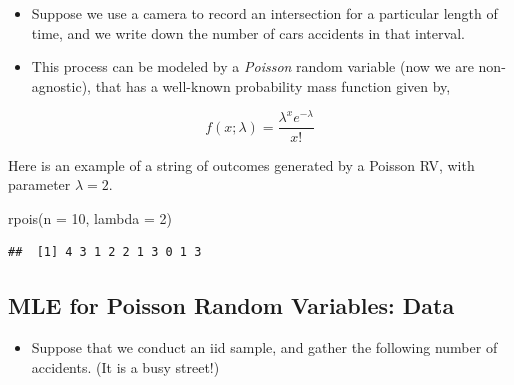 \documentclass[
]{book}
\newenvironment{Shaded}{\begin{snugshade}}{\end{snugshade}}
\newcommand{\AttributeTok}[1]{\textcolor[rgb]{0.77,0.63,0.00}{#1}}
\newcommand{\DecValTok}[1]{\textcolor[rgb]{0.00,0.00,0.81}{#1}}
\newcommand{\FunctionTok}[1]{\textcolor[rgb]{0.00,0.00,0.00}{#1}}
\newcommand{\NormalTok}[1]{#1}
\providecommand{\tightlist}{%
  \setlength{\itemsep}{0pt}\setlength{\parskip}{0pt}}
\theoremstyle{definition}
\theoremstyle{definition}
\theoremstyle{definition}
\theoremstyle{definition}
\theoremstyle{remark}
\begin{document}
\begin{itemize}
\tightlist
\item
  Suppose we use a camera to record an intersection for a particular length of time, and we write down the number of cars accidents in that interval.\\
\item
  This process can be modeled by a \emph{Poisson} random variable (now we are non-agnostic), that has a well-known probability mass function given by,
\end{itemize}

\[
f(x;\lambda) = \frac{\lambda^x e^{-\lambda}}{x!}
\]

Here is an example of a string of outcomes generated by a Poisson RV, with parameter \(\lambda = 2\).

\begin{Shaded}
\begin{Highlighting}[]
\FunctionTok{rpois}\NormalTok{(}\AttributeTok{n =} \DecValTok{10}\NormalTok{, }\AttributeTok{lambda =} \DecValTok{2}\NormalTok{)}
\end{Highlighting}
\end{Shaded}

\begin{verbatim}
##  [1] 4 3 1 2 2 1 3 0 1 3
\end{verbatim}

\hypertarget{mle-for-poisson-random-variables-data}{%
\subsection{MLE for Poisson Random Variables: Data}\label{mle-for-poisson-random-variables-data}}

\begin{itemize}
\tightlist
\item
  Suppose that we conduct an iid sample, and gather the following number of accidents. (It is a busy street!)
\end{itemize}
\end{document}
